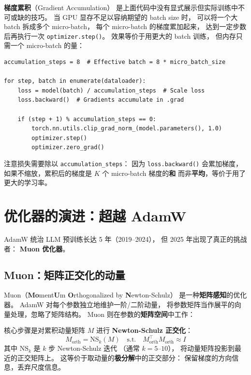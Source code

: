 \textbf{梯度累积}（Gradient Accumulation）
是上面代码中没有显式展示但实际训练中不可或缺的技巧。
当 GPU 显存不足以容纳期望的 batch size 时，
可以将一个大 batch 拆成多个 micro-batch，
每个 micro-batch 的梯度累加起来，
达到一定步数后再执行一次 \texttt{optimizer.step()}。
效果等价于用更大的 batch 训练，
但内存只需一个 micro-batch 的量：

\begin{lstlisting}[caption={Gradient accumulation}]
accumulation_steps = 8  # Effective batch = 8 * micro_batch_size

for step, batch in enumerate(dataloader):
    loss = model(batch) / accumulation_steps  # Scale loss
    loss.backward()  # Gradients accumulate in .grad

    if (step + 1) % accumulation_steps == 0:
        torch.nn.utils.clip_grad_norm_(model.parameters(), 1.0)
        optimizer.step()
        optimizer.zero_grad()
\end{lstlisting}

注意损失需要除以 \texttt{accumulation\_steps}：
因为 \texttt{loss.backward()} 会累加梯度，
如果不缩放，累积后的梯度是 $K$ 个 micro-batch 梯度的\textbf{和}
而非\textbf{平均}，等价于用了更大的学习率。

\section{优化器的演进：超越 AdamW}
\label{sec:new-optimizers}

AdamW 统治 LLM 预训练长达 5 年（2019--2024），
但 2025 年出现了真正的挑战者：
\textbf{Muon 优化器}。

\subsection{Muon：矩阵正交化的动量}

Muon（\textbf{Mo}ment\textbf{U}m \textbf{O}rthogonalized
by \textbf{N}ewton-Schulz）%
是一种\textbf{矩阵感知}的优化器。
AdamW 对每个参数独立地维护一阶/二阶动量，
将参数矩阵当作展平的向量处理，忽略了矩阵结构。
Muon 则在参数的\textbf{矩阵空间}中工作：

核心步骤是对累积动量矩阵 $M$ 进行
\textbf{Newton-Schulz 正交化}：
\begin{equation}
  M_{\mathrm{orth}} = \mathrm{NS}_k(M)
  \quad \text{s.t.} \quad M_{\mathrm{orth}}^\top M_{\mathrm{orth}} \approx I
\end{equation}
其中 $\mathrm{NS}_k$ 是 $k$ 步 Newton-Schulz 迭代
（通常 $k = 5$--$10$），
将动量矩阵投影到最近的正交矩阵上。
这等价于取动量的\textbf{极分解}中的正交部分：
保留梯度的方向信息，丢弃尺度信息。

